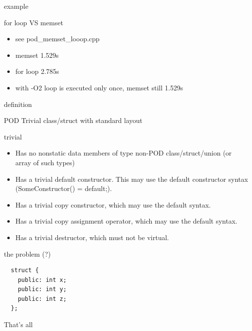 \documentclass{beamer}
\begin{document}
\begin{frame}{example}
  \begin{block}{for loop VS memset}
    \begin{itemize}
    \item see pod\_memset\_looop.cpp
    \item memset 1.529s
    \item for loop 2.785s
    \item with -O2 loop is executed only once, memset still 1.529s
    \end{itemize}
  \end{block}
\end{frame}

\begin{frame}{definition}
  \begin{block}{POD}
    Trivial class/struct with standard layout
  \end{block}

  \begin{block}{trivial}
    \begin{itemize}
    \item Has no nonstatic data members of type non-POD class/struct/union (or array of such types)
    \item Has a trivial default constructor. This may use the default constructor syntax (SomeConstructor() = default;).
    \item Has a trivial copy constructor, which may use the default syntax.
    \item Has a trivial copy assignment operator, which may use the default syntax.
    \item Has a trivial destructor, which must not be virtual.
    \end{itemize}
  \end{block}
\end{frame}

\begin{frame}[fragile]{the problem (?)}
  \begin{block}{}
\begin{verbatim}
  struct {
    public: int x;
    public: int y;
    public: int z;
  };

\end{verbatim}
  \end{block}
\end{frame}

\begin{frame}
  That's all
\end{frame}
\end{document}
